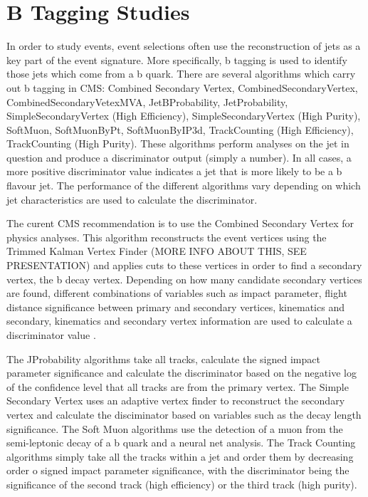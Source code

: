 \chapter{B Tagging Studies}
\label{c:b_tagging_studies}

In order to study \ttbar events, event selections often use the reconstruction of jets as a key part of the
event signature. More specifically, b tagging is used to identify those jets which come from a b quark. There
are several algorithms which carry out b tagging in CMS: Combined Secondary Vertex, CombinedSecondaryVertex,
CombinedSecondaryVetexMVA, JetBProbability, JetProbability, SimpleSecondaryVertex (High Efficiency),
SimpleSecondaryVertex (High Purity), SoftMuon, SoftMuonByPt, SoftMuonByIP3d, TrackCounting (High Efficiency),
TrackCounting (High Purity). These algorithms perform analyses on the jet in question and produce a
discriminator output (simply a number). In all cases, a more positive discriminator value indicates a jet that
is more likely to be a b flavour jet. The performance of the different algorithms vary depending on which jet
characteristics are used to calculate the discriminator.

The curent CMS recommendation is to use the Combined Secondary Vertex for physics analyses. This algorithm
reconstructs the event vertices using the Trimmed Kalman Vertex Finder (MORE INFO ABOUT THIS, SEE
PRESENTATION) and applies cuts to these vertices in order to find a secondary vertex, the b decay vertex.
Depending on how many candidate secondary vertices are found, different combinations of variables such as
impact parameter, flight distance significance between primary and secondary vertices, kinematics and
secondary, kinematics and secondary vertex information are used to calculate a discriminator value \cite{CSV}.

The JProbability algorithms take all tracks, calculate the signed impact parameter significance and calculate
the discriminator based on the negative log of the confidence level that all tracks are from the primary
vertex. The Simple Secondary Vertex uses an adaptive vertex finder to reconstruct the secondary vertex and
calculate the disciminator based on variables such as the decay length significance. The Soft Muon algorithms
use the detection of a muon from the semi-leptonic decay of a b quark and a neural net analysis. The Track
Counting algorithms simply take all the tracks within a jet and order them by decreasing order o signed impact
parameter significance, with the discriminator being the significance of the second track (high efficiency) or
the third track (high purity).

